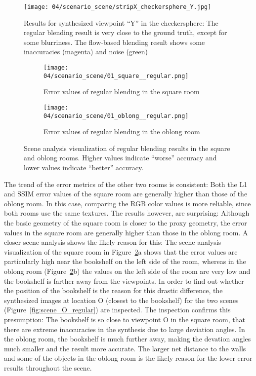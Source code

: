 \begin{figure}
		\centering
    \texttt{[image: 04/scenario\_scene/stripX\_checkersphere\_Y.jpg]}
		\caption[Viewpoint ``Y'' in the checkersphere]{Results for synthesized viewpoint ``Y'' in the checkersphere: The regular blending result is very close to the ground truth, except for some blurriness. The flow-based blending result shows some inaccuracies (magenta) and noise (green)}
		\label{fig:scene_checkersphere_Y}
\end{figure}

\begin{figure}
\centering
    \hfill
    \begin{subfigure}[b]{0.4\textwidth}
            \centering
            \texttt{[image: 04/scenario\_scene/01\_square\_\_regular.png]}
            \caption{Error values of regular blending in the square room}
    \end{subfigure}
    \hfill
    \begin{subfigure}[b]{0.4\textwidth}
            \centering
            \texttt{[image: 04/scenario\_scene/01\_oblong\_\_regular.png]}
            \caption{Error values of regular blending in the oblong room}
    \end{subfigure}
    \hfill
  \caption[Scene analysis visualization of regular blending results in the square and oblong rooms]{Scene analysis visualization of regular blending results in the square and oblong rooms. Higher values indicate ``worse'' accuracy and lower values indicate ``better'' accuracy.} \label{fig:scene_regular_square_oblong}
\end{figure}

The trend of the error metrics of the other two rooms is consistent: Both the L1 and SSIM error values of the square room are generally higher than those of the oblong room. In this case, comparing the RGB color values is more reliable, since both rooms use the same textures. The results however, are surprising: Although the basic geometry of the square room is closer to the proxy geometry, the error values in the square room are generally higher than those in the oblong room.
A closer scene analysis shows the likely reason for this: The scene analysis visualization of the square room in Figure~\ref{fig:scene_regular_square_oblong}a shows that the error values are particularly high near the bookshelf on the left side of the room, whereas in the oblong room (Figure~\ref{fig:scene_regular_square_oblong}b) the values on the left side of the room are very low and the bookshelf is farther away from the viewpoints.
In order to find out whether the position of the bookshelf is the reason for this drastic difference, the synthesized images at location O (closest to the bookshelf) for the two scenes (Figure~\ref{fig:scene_O_regular}) are inspected. The inspection confirms this presumption: The bookshelf is so close to viewpoint O in the square room, that there are extreme inaccuracies in the synthesis due to large deviation angles. In the oblong room, the bookshelf is much further away, making the devation angles much smaller and the result more accurate. The larger net distance to the walls and some of the objects in the oblong room is the likely reason for the lower error results throughout the scene.

